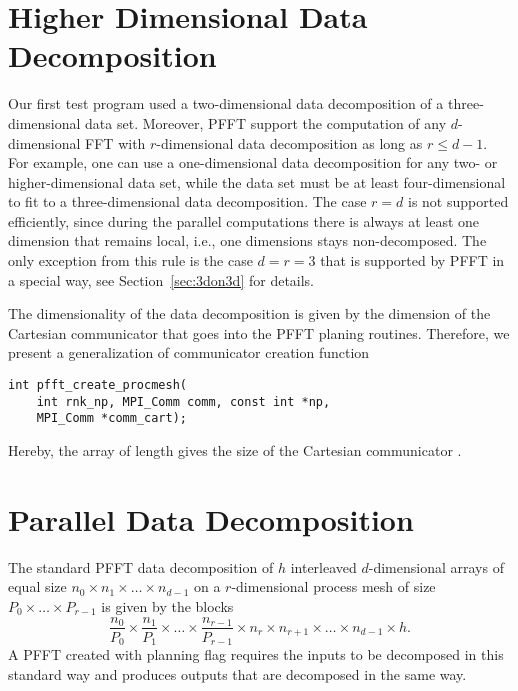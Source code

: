 \section{Higher Dimensional Data Decomposition}
Our first test program used a two-dimensional data decomposition of a three-dimensional data set.
Moreover, PFFT support the computation of any $d$-dimensional FFT with $r$-dimensional data decomposition
as long as $r\le d-1$. For example, one can use a one-dimensional data decomposition for any two- or higher-dimensional data set,
while the data set must be at least four-dimensional to fit to a three-dimensional data decomposition.
The case $r=d$ is not supported efficiently, since during the parallel computations
there is always at least one dimension that remains local, i.e., one dimensions stays non-decomposed.
The only exception from this rule is the case $d=r=3$ that is supported by PFFT in a special way, see Section~\ref{sec:3don3d} for details.

The dimensionality of the data decomposition is given by the dimension of the Cartesian communicator that
goes into the PFFT planing routines. Therefore, we present a generalization of communicator creation function
\begin{lstlisting}
int pfft_create_procmesh(
    int rnk_np, MPI_Comm comm, const int *np,
    MPI_Comm *comm_cart);
\end{lstlisting}
Hereby, the array  of length  gives the size of the Cartesian communicator .

\section{Parallel Data Decomposition}\label{sec:par-data-decomp}
The standard PFFT data decomposition of $h$ interleaved $d$-dimensional arrays of equal size $n_0 \times n_1\times \hdots \times n_{d-1}$
on a $r$-dimensional process mesh of size $P_0\times \hdots \times P_{r-1}$ is given by the blocks
\begin{equation*}
  \frac{n_0}{P_0} \times \frac{n_1}{P_1} \times \hdots \times \frac{n_{r-1}}{P_{r-1}}  \times n_r \times n_{r+1} \times \hdots \times n_{d-1} \times h.
\end{equation*}
A PFFT created with planning flag  requires the inputs to be decomposed in this standard way and produces
outputs that are decomposed in the same way.

